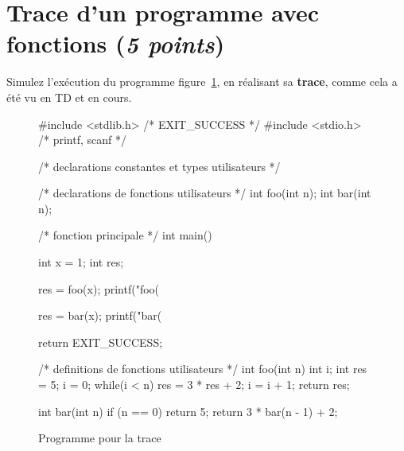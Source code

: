 \section{Trace d'un programme avec fonctions (\textit{5 points})}

\question Simulez l'exécution du programme figure~\ref{fig:prog}, en réalisant sa
\textbf{trace}, comme cela a été vu en TD et en cours. 

\begin{figure}[htbp]
  \centering
\begin{small}
\begin{listing}{1}
#include <stdlib.h> /* EXIT_SUCCESS */
#include <stdio.h> /* printf, scanf */

/* declarations constantes et types utilisateurs */

/* declarations de fonctions utilisateurs */
int foo(int n);
int bar(int n);

/* fonction principale */
int main()
{
    int x = 1;
    int res;

    res = foo(x);
    printf("foo(%
    
    res = bar(x);
    printf("bar(%

    return EXIT_SUCCESS;
}

/* definitions de fonctions utilisateurs */
int foo(int n)
{
    int i;
    int res = 5;
    i = 0;
    while(i < n)
    {
        res = 3 * res + 2;
        i = i + 1;
    }
    return res;
}

int bar(int n)
{
    if (n == 0) 
    {
        return 5;
    }
    return 3 * bar(n - 1) + 2;
}
\end{listing}
\end{small} 
  \caption{Programme pour la trace}
  \label{fig:prog}
\end{figure}

